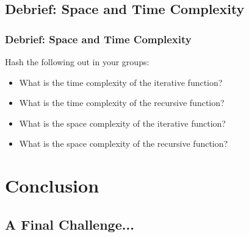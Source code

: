 \documentclass[hyperref={colorlinks,citecolor=blue,linkcolor=blue,urlcolor=blue}]{beamer}
\begin{document}
\subsection{Debrief: Space and Time Complexity}
\begin{frame}
  \frametitle{Debrief: Space and Time Complexity}
  Hash the following out in your groups:
  \begin{itemize}
    \item What is the time complexity of the iterative function?
    \item What is the time complexity of the recursive function?
    \item What is the space complexity of the iterative function?
    \item What is the space complexity of the recursive function?
\end{itemize}
\end{frame}

\section{Conclusion}
\subsection{A Final Challenge...}
\end{document}
